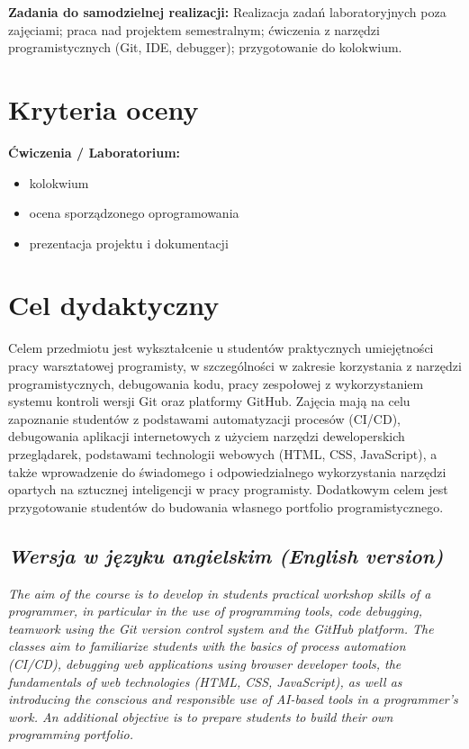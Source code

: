 \documentclass[12pt, a4paper]{article}
\begin{document}
\vspace{4pt}
\noindent\textbf{Zadania do samodzielnej realizacji:} Realizacja zadań laboratoryjnych poza zajęciami; praca nad projektem semestralnym; ćwiczenia z narzędzi programistycznych (Git, IDE, debugger); przygotowanie do kolokwium.

\section{Kryteria oceny}

\textbf{Ćwiczenia / Laboratorium:}
\begin{itemize}
  \item kolokwium
  \item ocena sporządzonego oprogramowania
  \item prezentacja projektu i dokumentacji
\end{itemize}


\section{Cel dydaktyczny}

Celem przedmiotu jest wykształcenie u studentów praktycznych umiejętności pracy warsztatowej programisty, w szczególności w zakresie korzystania z narzędzi programistycznych, debugowania kodu, pracy zespołowej z wykorzystaniem systemu kontroli wersji Git oraz platformy GitHub. Zajęcia mają na celu zapoznanie studentów z podstawami automatyzacji procesów (CI/CD), debugowania aplikacji internetowych z użyciem narzędzi deweloperskich przeglądarek, podstawami technologii webowych (HTML, CSS, JavaScript), a także wprowadzenie do świadomego i odpowiedzialnego wykorzystania narzędzi opartych na sztucznej inteligencji w pracy programisty. Dodatkowym celem jest przygotowanie studentów do budowania własnego portfolio programistycznego.

\subsection*{\textit{Wersja w języku angielskim (English version)}}

\textit{The aim of the course is to develop in students practical workshop skills of a programmer, in particular in the use of programming tools, code debugging, teamwork using the Git version control system and the GitHub platform. The classes aim to familiarize students with the basics of process automation (CI/CD), debugging web applications using browser developer tools, the fundamentals of web technologies (HTML, CSS, JavaScript), as well as introducing the conscious and responsible use of AI-based tools in a programmer’s work. An additional objective is to prepare students to build their own programming portfolio.}
\end{document}

